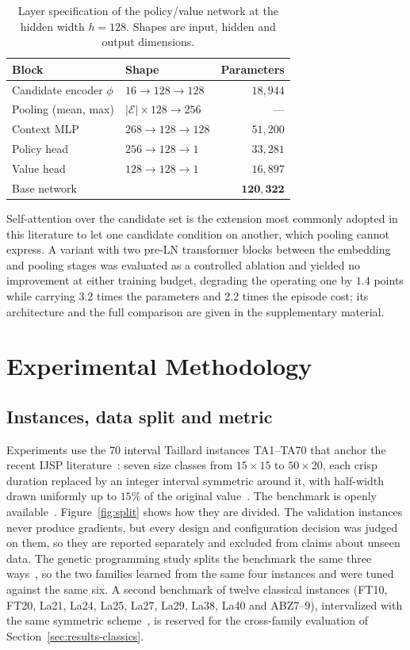 \documentclass[preprint,12pt]{elsarticle}
\theoremstyle{definition}
\theoremstyle{remark}
\begin{document}
\begin{table}[!htb]
\centering\small
\caption{Layer specification of the policy/value network at the
hidden width $h{=}128$. Shapes are input, hidden and output
dimensions.}
\label{tab:layers}
\begin{tabular*}{\textwidth}{@{\extracolsep{\fill}}llr}
\toprule
Block & Shape & Parameters \\
\midrule
Candidate encoder $\phi$ & $16\to128\to128$ & $18{,}944$ \\
Pooling (mean, max) & $|\mathcal{E}|\times128\to256$ & --- \\
Context MLP & $268\to128\to128$ & $51{,}200$ \\
Policy head & $256\to128\to1$ & $33{,}281$ \\
Value head & $128\to128\to1$ & $16{,}897$ \\
\midrule
Base network & & $\mathbf{120{,}322}$ \\
\bottomrule
\end{tabular*}
\end{table}

Self-attention over the candidate set is the extension most commonly
adopted in this literature to let one candidate condition on another,
which pooling cannot express. A variant with two pre-LN transformer
blocks between the embedding and pooling stages was evaluated as a
controlled ablation and yielded no improvement at either training
budget, degrading the operating one by $1.4$ points while carrying
3.2 times the parameters and 2.2 times the episode cost; its
architecture and the full comparison are given in the supplementary material.

\section{Experimental Methodology}
\label{sec:setup}

\subsection{Instances, data split and metric}
\label{sec:instances}

Experiments use the 70 interval Taillard instances TA1--TA70 that
anchor the recent IJSP
literature~\citep{DiazFEABC2023,DiazICAE2023}: seven size classes from
$15{\times}15$ to $50{\times}20$,
each crisp duration replaced by an integer interval symmetric around
it, with half-width drawn uniformly up to $15\%$ of the original
value~\citep{DiazGA2020}. The benchmark is openly
available~\citep{DiazDRLDataset2026}. Figure~\ref{fig:split} shows
how they are divided. The validation instances never produce
gradients, but every design and configuration decision was judged on
them, so they are reported separately and excluded from claims about
unseen data. The genetic programming study splits the benchmark the
same three ways~\citep{DiazGP2026}, so the two families learned from
the same four instances and were tuned against the same six. A second
benchmark of twelve classical instances (FT10, FT20, La21, La24,
La25, La27, La29, La38, La40 and ABZ7--9), intervalized with the same
symmetric scheme~\citep{DiazGA2020}, is reserved for the cross-family
evaluation of Section~\ref{sec:results-classics}.
\end{document}
